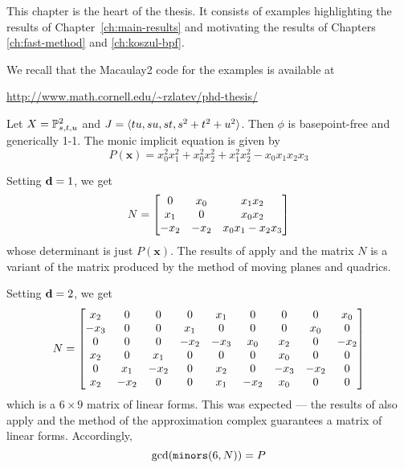 \documentclass[fleqn,reqno]{amsart}
\begin{document}



\begin{paragraf*}
This chapter is the heart of the thesis.
It consists of examples highlighting the results of Chapter~\ref{ch:main-results}
and motivating the results of Chapters \ref{ch:fast-method} and \ref{ch:koszul-bpf}.

We recall that the Macaulay2 code for the examples is available at
\begin{center}
\url{http://www.math.cornell.edu/~rzlatev/phd-thesis/}
\end{center}
\end{paragraf*}



\begin{example}[$\mt{ex301}$]
\label{ex301}
Let $X=\mathbb{P}^2_{s,t,u}$ and $J=\langle tu,su,st,s^2+t^2+u^2\rangle$.
Then $\phi$ is basepoint-free and generically 1-1.
The monic implicit equation is given by
\[
	P(\mathbf x)={x}_{0}^{2} {x}_{1}^{2}+{x}_{0}^{2} {x}_{2}^{2}+{x}_{1}^{2}
	{x}_{2}^{2}-{x}_{0} {x}_{1} {x}_{2} {x}_{3}
\]

Setting $\mathbf d=1$, we get
\[
	N=
	\bgroup\begin{bmatrix}0&
      {x}_{0}&
      {x}_{1} {x}_{2}\\
      {x}_{1}&
      0&
      {x}_{0} {x}_{2}\\
      {-{x}_{2}}&
      {-{x}_{2}}&
      {x}_{0} {x}_{1}-{x}_{2} {x}_{3}\\
      \end{bmatrix}\egroup
\]
whose determinant is just $P(\mathbf x)$.
The results of \citet{CGZ-00} apply and the matrix $N$ is a variant of the matrix
produced by the method of moving planes and quadrics.

Setting $\mathbf d=2$, we get
\[
	N=
	\bgroup\begin{bmatrix}{x}_{2}&
	      0&
	      0&
	      0&
	      {x}_{1}&
	      0&
	      0&
	      0&
	      {x}_{0}\\
	      {-{x}_{3}}&
	      0&
	      0&
	      {x}_{1}&
	      0&
	      0&
	      0&
	      {x}_{0}&
	      0\\
	      0&
	      0&
	      0&
	      {-{x}_{2}}&
	      {-{x}_{3}}&
	      {x}_{0}&
	      {x}_{2}&
	      0&
	      {-{x}_{2}}\\
	      {x}_{2}&
	      0&
	      {x}_{1}&
	      0&
	      0&
	      0&
	      {x}_{0}&
	      0&
	      0\\
	      0&
	      {x}_{1}&
	      {-{x}_{2}}&
	      0&
	      {x}_{2}&
	      0&
	      {-{x}_{3}}&
	      {-{x}_{2}}&
	      0\\
	      {x}_{2}&
	      {-{x}_{2}}&
	      0&
	      0&
	      {x}_{1}&
	      {-{x}_{2}}&
	      {x}_{0}&
	      0&
	      0\\
	      \end{bmatrix}\egroup
\]
which is a $6\times9$ matrix of linear forms.
This was expected --- the results of \cite{BJ-03} also apply and the method
of the approximation complex guarantees a matrix of linear forms.
Accordingly,
\[
	\gcd(\mathop{\tt minors}(6,N))=P
\]


\end{example}
\end{document}

